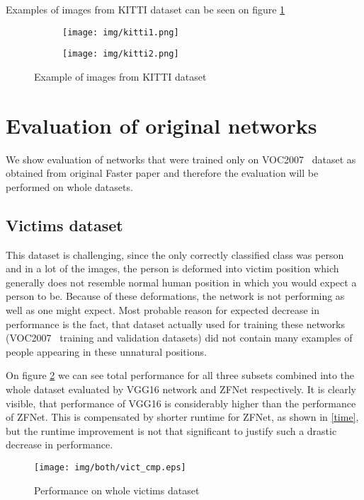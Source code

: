 Examples of images from KITTI dataset can be seen on figure \ref{kittiex}

\begin{figure}[!h]
\begin{subfigure}{.5\textwidth}
\centering
\texttt{[image: img/kitti1.png]}
\end{subfigure}%
\begin{subfigure}{.5\textwidth}
\centering
\texttt{[image: img/kitti2.png]}
\end{subfigure}
\caption{Example of images from KITTI dataset}
\label{kittiex}
\end{figure}

\section{Evaluation of original networks} \label{orig}

We show evaluation of networks that were trained only on VOC2007~\cite{voc2007} dataset as obtained from original Faster \rcnn{} paper and therefore the evaluation will be performed on whole datasets.

\subsection{Victims dataset}
This dataset is challenging, since the only correctly classified class was person and in a lot of the images, the person is deformed into victim position which generally does not resemble normal human position in which you would expect a person to be. Because of these deformations, the network is not performing as well as one might expect. Most probable reason for expected decrease in performance is the fact, that dataset actually used for training these networks (VOC2007~\cite{voc2007} training and validation datasets) did not contain many examples of people appearing in these unnatural positions.

On figure \ref{vicper} we can see total performance for all three subsets combined into the whole dataset evaluated by VGG16 network and ZFNet respectively. It is clearly visible, that performance of VGG16 is considerably higher than the performance of ZFNet. This is compensated by shorter runtime for ZFNet, as shown in \ref{time}, but the runtime improvement is not that significant to justify such a drastic decrease in performance.

\begin{figure}[!]
\texttt{[image: img/both/vict\_cmp.eps]} 
\caption{Performance on whole victims dataset}
\label{vicper}
\end{figure}

